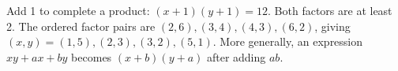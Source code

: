Add 1 to complete a product: $(x+1)(y+1)=12 $. Both factors are at least 2. The ordered factor pairs are $(2,6),(3,4),(4,3),(6,2)$, giving $\boxed{(x,y)=(1,5),(2,3),(3,2),(5,1)}$. More generally, an expression $ xy+ax+by $ becomes $(x+b)(y+a)$ after adding $ ab $.
